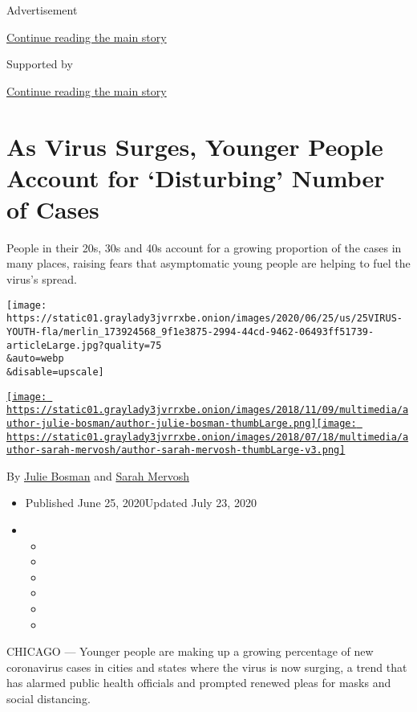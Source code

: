 Advertisement

\protect\hyperlink{after-top}{Continue reading the main story}

Supported by

\protect\hyperlink{after-sponsor}{Continue reading the main story}

\hypertarget{as-virus-surges-younger-people-account-for-disturbing-number-of-cases}{%
\section{As Virus Surges, Younger People Account for `Disturbing' Number
of
Cases}\label{as-virus-surges-younger-people-account-for-disturbing-number-of-cases}}

People in their 20s, 30s and 40s account for a growing proportion of the
cases in many places, raising fears that asymptomatic young people are
helping to fuel the virus's spread.

\texttt{[image: https://static01.graylady3jvrrxbe.onion/images/2020/06/25/us/25VIRUS-YOUTH-fla/merlin\_173924568\_9f1e3875-2994-44cd-9462-06493ff51739-articleLarge.jpg?quality=75\\\&auto=webp\\\&disable=upscale]}

\href{https://www.nytimes3xbfgragh.onion/by/julie-bosman}{\texttt{[image: https://static01.graylady3jvrrxbe.onion/images/2018/11/09/multimedia/author-julie-bosman/author-julie-bosman-thumbLarge.png]}}\href{https://www.nytimes3xbfgragh.onion/by/sarah-mervosh}{\texttt{[image: https://static01.graylady3jvrrxbe.onion/images/2018/07/18/multimedia/author-sarah-mervosh/author-sarah-mervosh-thumbLarge-v3.png]}}

By \href{https://www.nytimes3xbfgragh.onion/by/julie-bosman}{Julie
Bosman} and
\href{https://www.nytimes3xbfgragh.onion/by/sarah-mervosh}{Sarah
Mervosh}

\begin{itemize}
\item
  Published June 25, 2020Updated July 23, 2020
\item
  \begin{itemize}
  \item
  \item
  \item
  \item
  \item
  \item
  \end{itemize}
\end{itemize}

CHICAGO --- Younger people are making up a growing percentage of new
coronavirus cases in cities and states where the virus is now surging, a
trend that has alarmed public health officials and prompted renewed
pleas for masks and social distancing.

